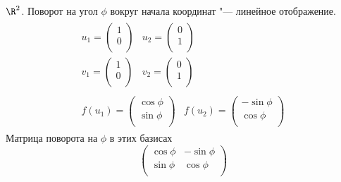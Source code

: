 \begin{exmp}
	$\R^2$.
	Поворот на угол $\phi$ вокруг начала координат "--- линейное отображение.
	\begin{gather*}
		\begin{array}{cc}
			u_1 = \begin{pmatrix}
				1 \\
				0 \\
			\end{pmatrix}
			&
			u_2 = \begin{pmatrix}
				0 \\
				1 \\
			\end{pmatrix}
			\\
			v_1 =
			\begin{pmatrix}
				1 \\
				0 \\
			\end{pmatrix}
			&
			v_2 =
			\begin{pmatrix}
				0 \\
				1 \\
			\end{pmatrix}
		\end{array} \\
		\begin{array}{cc}
			f(u_1) = \begin{pmatrix}
				\cos \phi \\
				\sin \phi \\
			\end{pmatrix}
			&
			f(u_2) = \begin{pmatrix}
				-\sin \phi \\
				\cos \phi \\
			\end{pmatrix}
		\end{array}
	\end{gather*}
	Матрица поворота на $\phi$ в этих базисах
	\[
		\begin{pmatrix}
			\cos \phi & -\sin \phi \\
			\sin \phi & \cos \phi \\
		\end{pmatrix}
	\]
\end{exmp}

